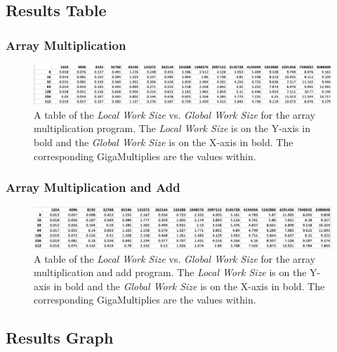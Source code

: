 \documentclass[onecolumn,draftclsnofoot, 10pt, compsoc]{IEEEtran}
\begin{document}
	\subsection{Results Table}
		\subsubsection{Array Multiplication}
			\begin{figure}[H]
				\includegraphics[width=18cm]{multTable}
				\centering
				\caption{A table of the \textit{Local Work Size} vs. \textit{Global Work Size} for the array multiplication program.
					The \textit{Local Work Size} is on the Y-axis in bold and the \textit{Global Work Size} is on the X-axis in bold. The corresponding GigaMultiplies are the values within.}
			\end{figure}
	
		\subsubsection{Array Multiplication and Add}
			\begin{figure}[H]
				\includegraphics[width=18cm]{multAddTable}
				\centering
				\caption{A table of the \textit{Local Work Size} vs. \textit{Global Work Size} for the array multiplication and add program.
				 The \textit{Local Work Size} is on the Y-axis in bold and the \textit{Global Work Size} is on the X-axis in bold. The corresponding GigaMultiplies are the values within.}
			\end{figure}
		
		
		
		
		
	\subsection{Results Graph}
\end{document}
